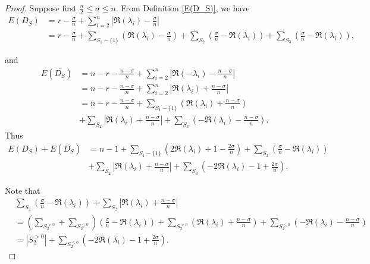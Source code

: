 \documentclass[10pt,a4paper]{amsart}
\begin{document}
    \begin{proof}
        Suppose first $\frac{n}{2} \leq \sigma \leq n $. From Definition \ref{E(D_S)}, we have 
        \begin{align*}
            E(D_S) &= r-\frac{\sigma}{n} + \sum_{i=2}^n \left| \Re(\lambda_i)-\frac{\sigma}{n} \right| \\
            &= r-\frac{\sigma}{n} + \sum_{S_1-\{1\}} \left( \Re(\lambda_i)-\frac{\sigma}{n} \right)+ \sum_{S_2} \left(\frac{\sigma}{n} -\Re(\lambda_i) \right)+ \sum_{S_3} \left( \frac{\sigma}{n}-\Re(\lambda_i) \right),
        \end{align*}
        
        and 
        \begin{align*}
            E(\overline{D_S}) &= n-r-\frac{n-\sigma}{n} + \sum_{i=2}^n \left| \Re(-\lambda_i)-\frac{n-\sigma}{n} \right|\\
            &= n-r-\frac{n-\sigma}{n}+\sum_{i=2}^n \left| \Re(\lambda_i)+\frac{n-\sigma}{n} \right| \\
            &= n-r-\frac{n-\sigma}{n}+ \sum_{S_1-\{1\}} \left( \Re(\lambda_i)  
            + \frac{n-\sigma}{n} \right)\\ &+ \sum_{S_2} \left| \Re(\lambda_i)+\frac{n-\sigma}{n} \right|+ \sum_{S_3} \left(-\Re(\lambda_i)-\frac{n-\sigma}{n} \right).
        \end{align*}
    Thus
    \begin{align*}
        E(D_S)+E(\overline{D_S}) 
        &= n-1+ \sum_{S_1-\{1\}}  \left( 2\Re(\lambda_i)+1-\frac{2\sigma}{n} \right) +\sum_{S_2} \left(\frac{\sigma}{n} -\Re(\lambda_i) \right) \\
        &+ \sum_{S_2} \left| \Re(\lambda_i)+\frac{n-\sigma}{n} \right| + \sum_{S_3} \left(-2\Re(\lambda_i)-1+\frac{2\sigma}{n} \right).
    \end{align*}

    Note that
    \begin{align*}
        &\sum_{S_2} \left(\frac{\sigma}{n} -\Re(\lambda_i) \right) + \sum_{S_2} \left| \Re(\lambda_i)+\frac{n-\sigma}{n} \right| \\
        &= \left( \sum_{S_2^{>0}} + \sum_{S_2^{\leq 0}} \right)  \left(\frac{\sigma}{n} -\Re(\lambda_i) \right) +  \sum_{S_2^{>0}} \left( \Re(\lambda_i)+\frac{n-\sigma}{n} \right)+\sum_{S_2^{\leq 0}} \left( -\Re(\lambda_i)-\frac{n-\sigma}{n} \right) \\
        &=|S_2^{>0}|+ \sum_{S_2^{\leq 0}} \left( -2\Re(\lambda_i)-1+\frac{2\sigma}{n} \right).
    \end{align*}


\end{proof}
\end{document}
